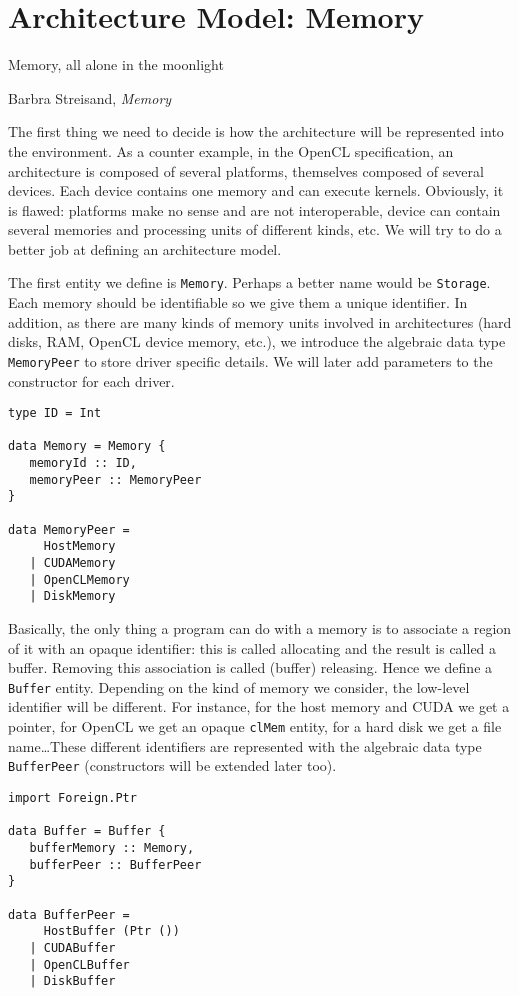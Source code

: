 \chapter{Architecture Model: Memory}

\epigraph{Memory, all alone in the moonlight}{Barbra Streisand,
\textit{Memory}}

The first thing we need to decide is how the architecture will be represented
into the environment.  As a counter example, in the OpenCL specification, an
architecture is composed of several platforms, themselves composed of several
devices. Each device contains one memory and can execute kernels. Obviously, it
is flawed: platforms make no sense and are not interoperable, device can contain
several memories and processing units of different kinds, etc. We will try to do
a better job at defining an architecture model.

The first entity we define is \texttt{Memory}. Perhaps a better name would be
\texttt{Storage}. Each memory should be identifiable so we give them a unique
identifier. In addition, as there are many kinds of memory units involved in
architectures (hard disks, RAM, OpenCL device memory, etc.), we introduce the
algebraic data type \texttt{MemoryPeer} to store driver specific details. We
will later add parameters to the constructor for each driver.

\begin{lstlisting}
type ID = Int

data Memory = Memory {
   memoryId :: ID,
   memoryPeer :: MemoryPeer
}

data MemoryPeer =
     HostMemory
   | CUDAMemory
   | OpenCLMemory
   | DiskMemory
\end{lstlisting}

Basically, the only thing a program can do with a memory is to associate a
region of it with an opaque identifier: this is called allocating and the result
is called a buffer. Removing this association is called (buffer) releasing.
Hence we define a \texttt{Buffer} entity. Depending on the kind of memory we
consider, the low-level identifier will be different. For instance, for the host
memory and CUDA we get a pointer, for OpenCL we get an opaque \texttt{clMem}
entity, for a hard disk we get a file name\ldots These different identifiers are
represented with the algebraic data type \texttt{BufferPeer} (constructors will
be extended later too).

\begin{lstlisting}
import Foreign.Ptr

data Buffer = Buffer {
   bufferMemory :: Memory,
   bufferPeer :: BufferPeer
}

data BufferPeer = 
     HostBuffer (Ptr ())
   | CUDABuffer
   | OpenCLBuffer
   | DiskBuffer
\end{lstlisting}

